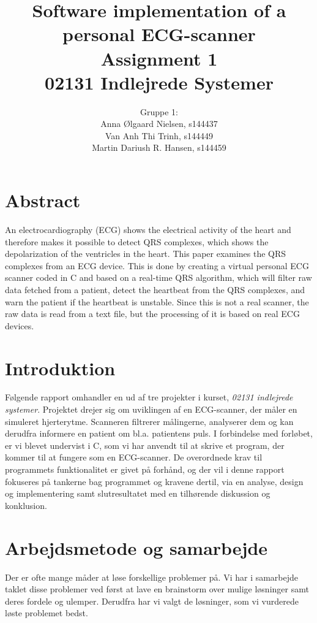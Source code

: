 \documentclass{article}
\title{\huge Software implementation of a personal ECG-scanner \\ \LARGE Assignment 1 \\ \LARGE 02131 Indlejrede Systemer}
\author{Gruppe 1: \\Anna Ølgaard Nielsen, s144437 \\ Van Anh Thi Trinh, s144449 \\ Martin Dariush R. Hansen, s144459}
\date{\myfont \displaydate{date}}
\begin{document}
\maketitle

\newpage

\section*{Abstract}
An electrocardiography (ECG) shows the electrical activity of the heart and therefore makes it possible to detect QRS complexes, which shows the depolarization of the ventricles in the heart\cite{3}. This paper examines the QRS complexes from an ECG device. This is done by creating a virtual personal ECG scanner coded in C and based on a real-time QRS algorithm, which will filter raw data fetched from a patient, detect the heartbeat from the QRS complexes\cite{1}, and warn the patient if the heartbeat is unstable. Since this is not a real scanner, the raw data is read from a text file, but the processing of it is based on real ECG devices.

\tableofcontents

\newpage
\section{Introduktion}
Følgende rapport omhandler en ud af tre projekter i kurset, \textit{02131 indlejrede systemer}. Projektet drejer sig om uviklingen af en ECG-scanner, der måler en simuleret hjerterytme. Scanneren filtrerer målingerne, analyserer dem og kan derudfra informere en patient om bl.a. patientens puls. I forbindelse med forløbet, er vi blevet undervist i C, som vi har anvendt til at skrive et program, der kommer til at fungere som en ECG-scanner. De overordnede krav til programmets funktionalitet er givet på forhånd, og der vil i denne rapport fokuseres på tankerne bag programmet og kravene dertil, via en analyse, design og implementering samt slutresultatet med en tilhørende diskussion og konklusion.


\newpage
\section{Arbejdsmetode og samarbejde}
Der er ofte mange måder at løse forskellige problemer på. Vi har i samarbejde taklet disse problemer ved først at lave en brainstorm over mulige løsninger samt deres fordele og ulemper. Derudfra har vi valgt de løsninger, som vi vurderede løste problemet bedst.
\end{document}

